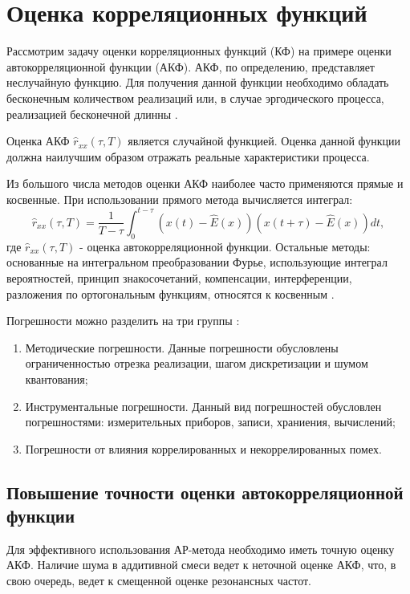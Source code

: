 \chapter{Оценка корреляционных функций}

Рассмотрим задачу оценки корреляционных функций (КФ) на примере оценки автокорреляционной функции (АКФ). АКФ, по определению, представляет неслучайную функцию.
Для получения данной функции необходимо обладать бесконечным количеством реализаций или, в случае эргодического процесса, реализацией бесконечной длинны \cite{bolshakov-book}.

Оценка АКФ ${\hat{r}_{xx}(\tau, T)}$ является случайной функцией. Оценка данной функции должна наилучшим образом отражать реальные характеристики процесса.

Из большого числа методов оценки АКФ наиболее часто применяются прямые и косвенные. При использовании прямого метода вычисляется интеграл:
\begin{equation}
	\label{eq:acf_integral_basic}
	\hat{r}_{xx}(\tau, T) = \frac{1}{T-\tau} \int_{0}^{t-\tau} (x(t) - \hat{E}(x))(x(t+\tau) - \hat{E}(x))dt,
\end{equation}
где ${\hat{r}_{xx}(\tau, T)}$ -  оценка автокорреляционной функции. Остальные методы: основанные на интегральном преобразовании Фурье, использующие интеграл вероятностей, принцип
знакосочетаний, компенсации, интерференции, разложения по ортогональным функциям, относятся к косвенным \cite{bolshakov-book}.

Погрешности можно разделить на три группы \cite{bolshakov-book}:
\begin{enumerate}
	\item Методические погрешности. Данные погрешности обусловлены ограниченностью отрезка реализации, шагом дискретизации и шумом квантования;
	\item Инструментальные погрешности. Данный вид погрешностей обусловлен погрешностями: измерительных приборов, записи, храниения, вычислений;
	\item Погрешности от влияния коррелированных и некоррелированных помех.
\end{enumerate}


\section{Повышение точности оценки автокорреляционной функции}
Для эффективного использования АР-метода необходимо иметь точную оценку АКФ. Наличие шума в аддитивной смеси ведет к неточной
оценке АКФ, что, в свою очередь, ведет к смещенной оценке резонансных частот.

